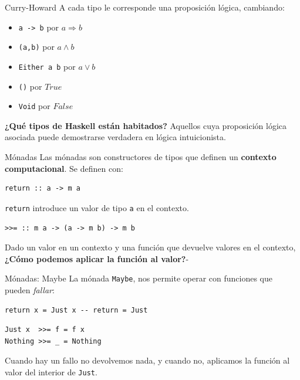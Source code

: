 \begin{frame}[fragile]{Curry-Howard}
 A cada tipo le corresponde una proposición lógica, cambiando:
 \begin{itemize}
  \item \texttt{a -> b} por $a \Rightarrow b$
  \item \texttt{(a,b)} por $a \wedge b$
  \item \texttt{Either a b} por $a \vee b$
  \item \texttt{()} por $True$
  \item \texttt{Void} por $False$
 \end{itemize}

 \espacio
 \textbf{¿Qué tipos de Haskell están habitados?} Aquellos cuya
 proposición lógica asociada puede demostrarse verdadera en lógica
 intuicionista.

\end{frame}

\begin{frame}[fragile]{Mónadas}
Las mónadas son constructores de tipos que definen un \textbf{contexto computacional}.
Se definen con:

\espacio

\begin{lstlisting}
return :: a -> m a
\end{lstlisting}
\texttt{return} introduce un valor de tipo \texttt{a} en el contexto.

\espacio

\begin{lstlisting}
>>= :: m a -> (a -> m b) -> m b
\end{lstlisting}
Dado un valor en un contexto y una función que devuelve valores en el contexto,
\textbf{¿Cómo podemos aplicar la función al valor?}-
\end{frame}

\begin{frame}[fragile]{Mónadas: Maybe}
La mónada \texttt{Maybe}, nos permite operar con funciones que pueden \textit{fallar}:

\begin{lstlisting}
return x = Just x -- return = Just
\end{lstlisting}

\espacio

\begin{lstlisting}
Just x  >>= f = f x
Nothing >>= _ = Nothing
\end{lstlisting}
Cuando hay un fallo no devolvemos nada, y cuando no, aplicamos la función al valor
del interior de \texttt{Just}.
\end{frame}

